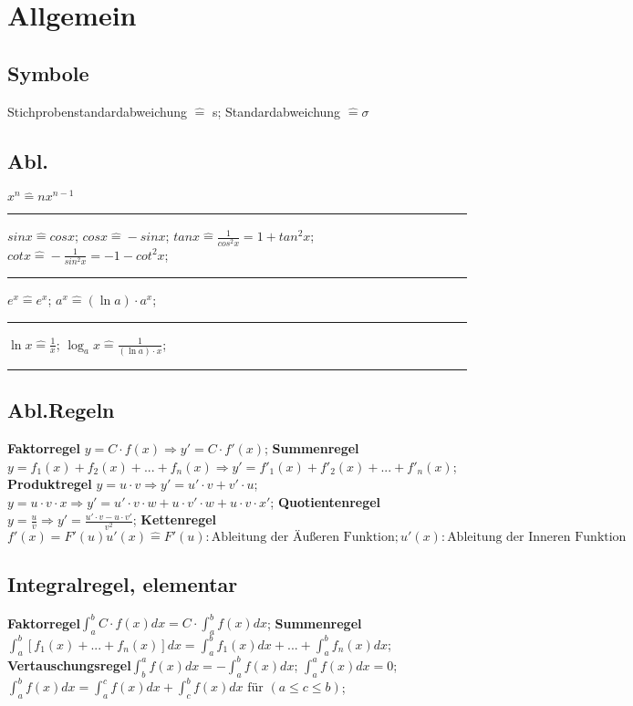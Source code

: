 \section{Allgemein}
\subsection{Symbole}
Stichprobenstandardabweichung $ \hat{=} $ s;
Standardabweichung $ \hat{=} \sigma $
\subsection{Abl.}
$ x^n  \hat{=} nx^{n-1}$
\hrule
$ sin x \hat{=} cos x $; 
$ cos x  \hat{=} - sin x $; 
$ tan x \hat{=} \frac{1}{cos^2 x} = 1 + tan^2 x $;
$ cot x \hat{=} - \frac{1}{sin^2 x} = - 1 -cot^2 x $; 
\hrule
$ e^x \hat{=} e^x $; 
$ a^x \hat{=} (\ln a) \cdot a^x $; 
\hrule
$ \ln x \hat{=} \frac{1}{x} $;
$ \log_a x  \hat{=} \frac{1}{(\ln a) \cdot x}$; 
\hrule
\subsection{Abl.Regeln}
\textbf{Faktorregel} $ y = C \cdot f(x) \Rightarrow  y' = C \cdot f'(x) $; 
\textbf{Summenregel} $ y = f_{1}(x) + f_{2}(x) + ... +f_{n}(x) \Rightarrow y' = f'_{1}(x) + f'_{2}(x) + ... + f'_{n}(x) $; 
\textbf{Produktregel} $ y = u \cdot v \Rightarrow y' = u'\cdot v + v' \cdot u $; 
$ y = u \cdot v \cdot x \Rightarrow y' = u' \cdot v \cdot w + u \cdot v' \cdot w + u \cdot v \cdot x'$; 
\textbf{Quotientenregel} $ y = \frac{u}{v} \Rightarrow y' = \frac{u' \cdot v - u \cdot v'}{v^2}$; 
\textbf{Kettenregel} $ f'(x) = F'(u) u'(x) \hat{=} F'(u): \text{Ableitung der Äußeren Funktion}; u'(x): \text{Ableitung der Inneren Funktion}$
\subsection{Integralregel, elementar}
\textbf{Faktorregel}$\int_{a}^{b}  C \cdot f(x) dx = C \cdot \int_{a}^{b} f(x)dx$; 
\textbf{Summenregel} $ \int_{a}^{b} [f_{1}(x) + ... + f_{n}(x)] dx = \int_{a}^{b} f_{1}(x) dx + ... + \int_{a}^{b}f_{n}(x) dx$; 
\textbf{Vertauschungsregel}$ \int_{b}^{a}f(x) dx = -\int_{a}^{b} f(x) dx$; 
$ \int_{a}^{a} f(x) dx = 0 $; 
$ \int_{a}^{b}f(x) dx = \int_{a}^{c} f(x) dx + \int_{c}^{b} f(x) dx  \text{ für } (a \le c \le b) $; 

